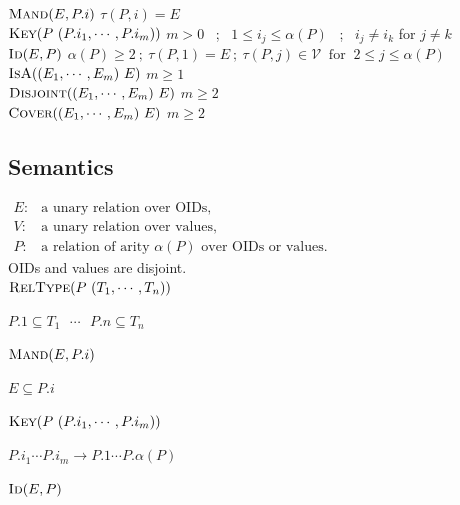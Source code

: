 \documentclass[10pt]{article}
\newcommand{\ols}[1]{\mskip.5\thinmuskip\overline{\mskip-.5\thinmuskip {#1} \mskip-.5\thinmuskip}\mskip.5\thinmuskip} %
\begin{document}
$\textsc{Mand}(E, P.i)$
\hfill { $\tau(P,i)=E$}\\
%
$\textsc{Key}(P\ (P.i_1, \cdots , P.i_m))$ \hfill{ $m>0$ ~;~ \(1\leq i_j\leq\alpha(P)\) ~;~ \(i_j\neq i_k\) for $j\neq k$}\\
%
$\textsc{Id}(E, P)$ 
\hfill { $\alpha(P)\geq 2 ~;~ \tau(P,1)=E ~;~ \tau(P,j)\in\mathcal V ~\text{ for }~ 2\leq j\leq\alpha(P)$}\\
%
$\textsc{IsA}((E_1,\cdots,E_m)\ E)$ \hfill{ $m\geq 1$}\\
$\textsc{Disjoint}((E_1,\cdots,E_m)\ E)$ \hfill{ $m\geq 2$}\\
$\textsc{Cover}((E_1,\cdots,E_m)\ E)$ \hfill{ $m\geq 2$}


\subsection*{Semantics}

\noindent$
\begin{array}{ll}
E: & \text{a unary relation over OIDs,}\\
V: & \text{a unary relation over values,}\\
P: & \text{a relation of arity \(\alpha(P)\) over OIDs or values.}
\end{array}
$\\
OIDs and values are disjoint.
\\

\noindent
$\textsc{RelType}(P\ (T_1, \cdots , T_n))$

$P.1\subseteq T_1 ~~~\cdots~~~ P.n\subseteq T_n$

\noindent
$\textsc{Mand}(E, P.i)$

$E\subseteq P.i$

\noindent
$\textsc{Key}(P\ (P.i_1, \cdots , P.i_m))$

$P.i_1 \cdots P.i_m\rightarrow P.1\cdots P.{\alpha(P)}$

%


\vspace{.5ex}\noindent
$\textsc{Id}(E, P)$
\end{document}
